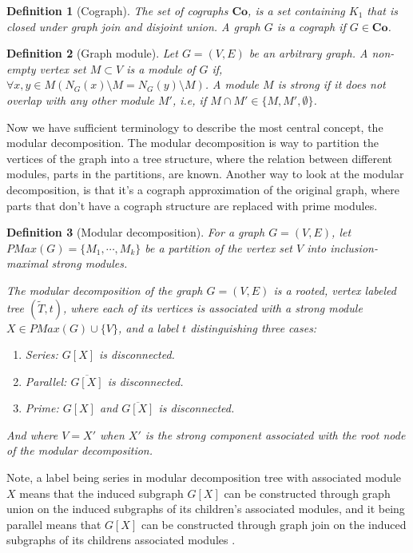 \documentclass{amsart}
\newtheorem{definition}{Definition}[section]
\begin{document}
\begin{definition}[Cograph]
    The set of cographs $\textbf{Co}$, is a set containing $K_1$ that is closed under 
    graph join and disjoint union. A graph $G$ is a cograph if $G \in \textbf{Co}$.
\end{definition}


\begin{definition}[Graph module]
    Let $G = (V,E)$ be an arbitrary graph. A non-empty vertex set $M \subset V$
    is a module of $G$ if, $\forall x,y \in M (N_G(x) \setminus M = N_G(y) \setminus M)  $. A module $M$ is
    strong if it does not overlap with any other module $M'$, i.e, if 
    $M \cap M' \in \{M,M',\emptyset \}$.
\end{definition}
  

Now we have sufficient terminology to describe the most central concept, the
modular decomposition. The modular decomposition is way to partition the
vertices of the graph into a tree structure, where the relation between
different modules, parts in the partitions, are known. Another way to look at
the modular decomposition, is that it's a cograph approximation of the original
graph, where parts that don't have a cograph structure are replaced with prime
modules.

\begin{definition}[Modular decomposition]
    For a graph $G = (V,E)$, let $PMax(G) = \{M_1,\cdots,M_k\}$ be a partition of the vertex set $V$ 
    into inclusion-maximal strong modules.
    
    The modular decomposition of the graph $G = (V,E)$ is a rooted, vertex labeled tree
    $(\widetilde{T},t)$, where each of its vertices is associated with a strong
    module $X \in PMax(G) \cup \{V\}$, and a label $t$ distinguishing  three cases:

    \begin{enumerate}
        \item Series: $G[X]$ is disconnected.
        \item Parallel: $\overline{G[X]}$ is disconnected.
        \item Prime: $G[X]$ and $\overline{G[X]}$ is disconnected.
    \end{enumerate}

    And where $V = X'$ when $X'$ is the strong component associated with the
    root node of the modular decomposition.
\end{definition}

Note, a label being series in modular decomposition tree with associated module
$X$ means that the induced subgraph $G[X]$ can be constructed through graph
union on the induced subgraphs of its children's associated modules, and it being
parallel means that $G[X]$ can be constructed through graph join on the
induced subgraphs of its childrens associated modules \cite{HCL}.
\end{document}
